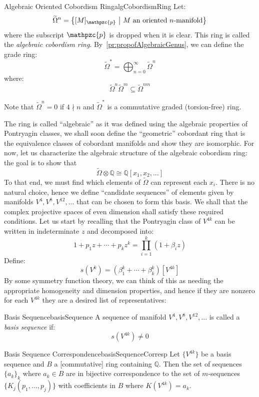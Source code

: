\documentclass{book}
\newcommand{\Q}{{\mathbb{Q}}}
\newcommand{\cp}{{\mathpzc{p}}}
\newcommand{\sse}{\subseteq}
\newcommand{\set}[2]{\left\{#1 \ \middle|\ #2\right\}}
\begin{document}
\begin{defn}{Algebraic Oriented Cobordism Ring}{algCobordismRing}
  Let:
  \[
    \widetilde{\Omega}^n = \set{[M]_\cp}{\text{$M$ an oriented $n$-manifold}}
  \]
  where the subscript $\cp$ is dropped when it is clear. This ring is called the \emph{algebraic cobordism
  ring}. By~\cref{pr:propofAlgebraicGenus}, we can define the
  grade ring:
  \[
    \widetilde{\Omega}^* = \bigoplus_{n=0}^\infty \widetilde{\Omega}^n
  \]
  where:
  \[
    \widetilde{\Omega}^n \widetilde{\Omega}^m \sse \widetilde{\Omega}^{nm}
  \]
\end{defn}

Note that $\widetilde{\Omega}^n = 0$ if $4\nmid n$ and $\widetilde{\Omega}^*$ is a commutative graded (torsion-free)
ring.

The ring is called ``algebraic'' as it was defined using the algebraic properties of Pontryagin classes, we
shall soon define the ``geometric'' cobordant ring that is the equivalence classes of cobordant manifolds and
show they are isomorphic. For now, let us characterize the algebraic structure of the algebraic cobordism
ring: the goal is to show that
\[
  \widetilde{\Omega}\otimes \Q \cong \Q[x_1, x_2, ...]
\]
To that end, we must find which elements of $\widetilde{\Omega}$ can represent each $x_i$. There is no natural
choice, hence we define ``candidate sequences'' of elements given by manifolds $V^4, V^8, V^{12}, ...$ that
can be chosen to form this basis. We shall that the complex projective spaces of even
dimension shall satisfy these required conditions. Let us start by recalling that the Pontryagin class of $V^{4k}$ can be written in indeterminate $z$
and decomposed into:
\[
  1 + p_1z + \cdots + p_kz^k = \prod_{i=1}^k (1 + \beta_iz)
\]
Define:
\[
  s(V^k) = (\beta_1^k + \cdots + \beta_k^k)[V^{4k}]
\]
By some symmetry function theory, we can think of this as needing the appropriate homogeneity and dimension
properties, and hence if they are nonzero for each $V^{4k}$ they are a desired list of representatives:
\begin{defn}{Basis Sequence}{basisSequence}
  A sequence of manifold $V^4, V^8, V^{12}, ...$ is called a \emph{basis sequence} if:
  \[
    s(V^{4k}) \ne 0
  \]
\end{defn}


\begin{thm}{Basis Sequence Correspondence}{basisSequenceCorresp}
  Let $\{V^{4k}\}$ be a basis sequence and $B$ a [commutative] ring containing $\Q$. Then the set of sequences
  $\{a_k\}_k$ where $a_k \in B$ are in bijective correspondence to the set of $m$-sequences $\{K_j(p_1, ...,
  p_j)\}$ with coefficients in $B$ where $K(V^{4k}) = a_k$.
\end{thm}
\end{document}

